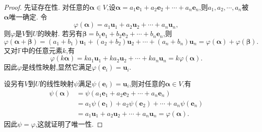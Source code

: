\documentclass[../../main.tex]{subfiles}%
\begin{document}
\begin{proof}
先证存在性. 对任意的\(\boldsymbol{\alpha}\in V\),设\(\boldsymbol{\alpha}=a_1\boldsymbol{e}_1 + a_2\boldsymbol{e}_2+\cdots + a_n\boldsymbol{e}_n\),则\(a_1,a_2,\cdots,a_n\)被\(\boldsymbol{\alpha}\)唯一确定. 令
\[
\varphi(\boldsymbol{\alpha})=a_1\boldsymbol{u}_1 + a_2\boldsymbol{u}_2+\cdots + a_n\boldsymbol{u}_n,
\]
则\(\varphi\)是\(V\)到\(U\)的映射. 若另有\(\boldsymbol{\beta}=b_1\boldsymbol{e}_1 + b_2\boldsymbol{e}_2+\cdots + b_n\boldsymbol{e}_n\),则
\[
\varphi(\boldsymbol{\alpha}+\boldsymbol{\beta})=(a_1 + b_1)\boldsymbol{u}_1+(a_2 + b_2)\boldsymbol{u}_2+\cdots+(a_n + b_n)\boldsymbol{u}_n=\varphi(\boldsymbol{\alpha})+\varphi(\boldsymbol{\beta}).
\]
又对\(\mathbb{F}\)中的任意元素\(k\),有
\[
\varphi(k\boldsymbol{\alpha})=ka_1\boldsymbol{u}_1 + ka_2\boldsymbol{u}_2+\cdots + ka_n\boldsymbol{u}_n=k\varphi(\boldsymbol{\alpha}).
\]
因此\(\varphi\)是线性映射,显然它满足\(\varphi(\boldsymbol{e}_i)=\boldsymbol{u}_i\).

设另有\(V\)到\(U\)的线性映射\(\psi\)满足\(\psi(\boldsymbol{e}_i)=\boldsymbol{u}_i\),则对任意的\(\boldsymbol{\alpha}\in V\),有
\begin{align*}
\psi(\boldsymbol{\alpha})&=\psi(a_1\boldsymbol{e}_1 + a_2\boldsymbol{e}_2+\cdots + a_n\boldsymbol{e}_n)\\
&=a_1\psi(\boldsymbol{e}_1)+a_2\psi(\boldsymbol{e}_2)+\cdots + a_n\psi(\boldsymbol{e}_n)\\
&=a_1\boldsymbol{u}_1 + a_2\boldsymbol{u}_2+\cdots + a_n\boldsymbol{u}_n=\varphi(\boldsymbol{\alpha}).
\end{align*}
因此\(\psi = \varphi\),这就证明了唯一性. 
\end{proof}
\end{document}
